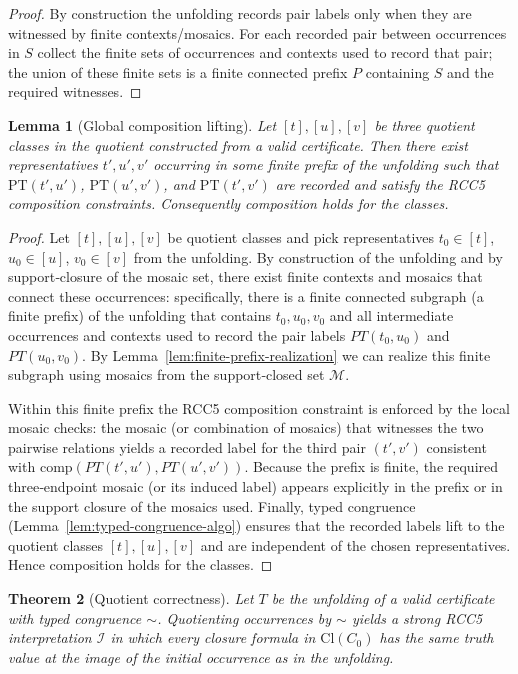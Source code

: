 \documentclass[11pt]{article}
\newcommand{\Cl}{\mathrm{Cl}}
\newtheorem{theorem}{Theorem}[section]
\newtheorem{lemma}[theorem]{Lemma}
\begin{document}
\begin{proof}
By construction the unfolding records pair labels only when they are witnessed by finite contexts/mosaics. For each recorded pair between occurrences in $S$ collect the finite sets of occurrences and contexts used to record that pair; the union of these finite sets is a finite connected prefix $P$ containing $S$ and the required witnesses.
\end{proof}


\begin{lemma}[Global composition lifting]
\label{lem:global-composition}
Let $[t],[u],[v]$ be three quotient classes in the quotient constructed from
a valid certificate. Then there exist representatives $t',u',v'$ occurring in
some finite prefix of the unfolding such that $\mathrm{PT}(t',u')$,
$\mathrm{PT}(u',v')$, and $\mathrm{PT}(t',v')$ are recorded and satisfy the
RCC5 composition constraints. Consequently composition holds for the classes.
\end{lemma}

\begin{proof}
Let $[t],[u],[v]$ be quotient classes and pick representatives $t_0\in[t]$,
$u_0\in[u]$, $v_0\in[v]$ from the unfolding. By construction of the unfolding
and by support‑closure of the mosaic set, there exist finite contexts and
mosaics that connect these occurrences: specifically, there is a finite
connected subgraph (a finite prefix) of the unfolding that contains $t_0,u_0,v_0$
and all intermediate occurrences and contexts used to record the pair labels
$PT(t_0,u_0)$ and $PT(u_0,v_0)$. By Lemma~\ref{lem:finite-prefix-realization} we can
realize this finite subgraph using mosaics from the support‑closed set
$\mathcal{M}$.

Within this finite prefix the RCC5 composition constraint is enforced by the
local mosaic checks: the mosaic (or combination of mosaics) that witnesses
the two pairwise relations yields a recorded label for the third pair
$(t',v')$ consistent with $\mathrm{comp}(PT(t',u'),PT(u',v'))$. Because the
prefix is finite, the required three‑endpoint mosaic (or its induced label)
appears explicitly in the prefix or in the support closure of the mosaics
used. Finally, typed congruence (Lemma~\ref{lem:typed-congruence-algo}) ensures
that the recorded labels lift to the quotient classes $[t],[u],[v]$ and are
independent of the chosen representatives. Hence composition holds for the
classes.
\end{proof}


\begin{theorem}[Quotient correctness]
\label{thm:quotient-correct}
Let $T$ be the unfolding of a valid certificate with typed congruence $\sim$.
Quotienting occurrences by $\sim$ yields a strong RCC5 interpretation
$\mathcal{I}$ in which every closure formula in $\Cl(C_0)$ has the same truth
value at the image of the initial occurrence as in the unfolding.
\end{theorem}
\end{document}

